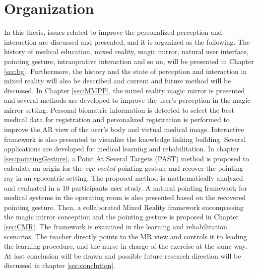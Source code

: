 \section{Organization}
In this thesis, issues related to improve the personalized perception and interaction are discussed and presented, and it is organized as the following. The history of medical education, mixed reality, magic mirror, natural user interface, pointing gesture, intraoprative interaction and so on, will be presented in Chapter \ref{sec:bg}. Furthermore, the history and the state of perception and interaction in mixed reality will also be described and current and future method will be discussed. 
In Chapter \ref{sec:MMPP}, the mixed reality magic mirror is presented and several methods are developed to improve the user's perception in the magic mirror setting. Personal biomatric information is detected to select the best medical data for registration and personalized registration is performed to improve the AR view of the user's body and virtual medical image. Interactive framework is also presented to visualize the knowledge linking building. Several applications are developed for medical learning and rehabilitation.
In chapter \ref{sec:pointingGesture}, a Point At Several Targets (PAST) method is proposed to calculate an origin for the \textit{eye-rooted} pointing gesture and recover the pointing ray in an egocentric setting. The proposed method is mathematically analyzed and evaluated in a 10 participants user study. A natural pointing framework for medical systems in the operating room is also presented based on the recovered pointing gesture. 
Then, a collaborated Mixed Reality framework encompassing the magic mirror conception and the pointing gesture is proposed in Chapter \ref{sec:CMR}. 
The framework is examined in the learning and rehabilitation scenarios. The teacher directly points to the MR view and controls it to leading the learning procedure, and the nurse in charge of the exercise at the same way.
At last conclusion will be drawn and possible future research direction will be discussed in chapter \ref{sec:conclution}.